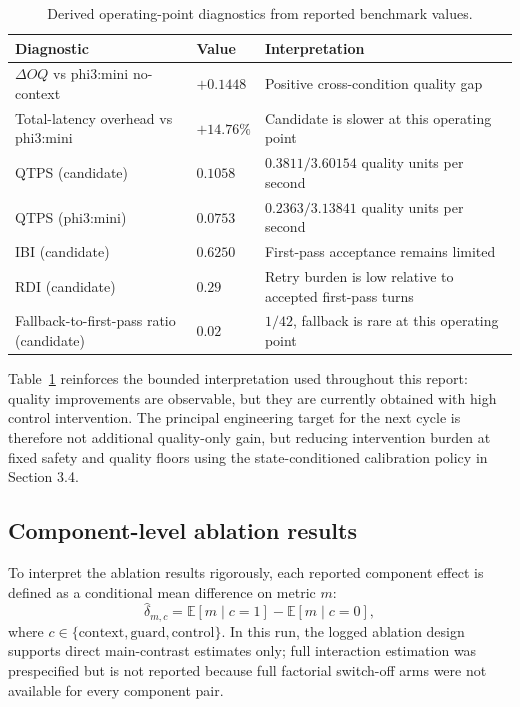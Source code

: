 ﻿\documentclass[a4paper,12pt]{article}
\begin{document}
\begin{table}[t]
\centering
\caption{Derived operating-point diagnostics from reported benchmark values.}
\label{tab:operating_point_diagnostics}
\begingroup
\footnotesize
\setlength{\tabcolsep}{4pt}
\begin{tabular}{p{}p{}p{}}
\toprule
Diagnostic & Value & Interpretation \\
\midrule
\(\Delta OQ\) vs phi3:mini no-context & \(+0.1448\) & Positive cross-condition quality gap \\
Total-latency overhead vs phi3:mini & \(+14.76\%\) & Candidate is slower at this operating point \\
QTPS (candidate) & \(0.1058\) & \(0.3811/3.60154\) quality units per second \\
QTPS (phi3:mini) & \(0.0753\) & \(0.2363/3.13841\) quality units per second \\
IBI (candidate) & \(0.6250\) & First-pass acceptance remains limited \\
RDI (candidate) & \(0.29\) & Retry burden is low relative to accepted first-pass turns \\
Fallback-to-first-pass ratio (candidate) & \(0.02\) & \(1/42\), fallback is rare at this operating point \\
\bottomrule
\end{tabular}
\endgroup
\end{table}

Table~\ref{tab:operating_point_diagnostics} reinforces the bounded interpretation used throughout this report: quality improvements are observable, but they are currently obtained with high control intervention. The principal engineering target for the next cycle is therefore not additional quality-only gain, but reducing intervention burden at fixed safety and quality floors using the state-conditioned calibration policy in Section 3.4.

\subsection{Component-level ablation results}

To interpret the ablation results rigorously, each reported component effect is defined as a conditional mean difference on metric \(m\):
\begin{equation}
\hat{\delta}_{m,c}=\mathbb{E}[m\mid c=1]-\mathbb{E}[m\mid c=0],
\end{equation}
where \(c\in\{\text{context},\text{guard},\text{control}\}\). In this run, the logged ablation design supports direct main-contrast estimates only; full interaction estimation was prespecified but is not reported because full factorial switch-off arms were not available for every component pair.
\end{document}
